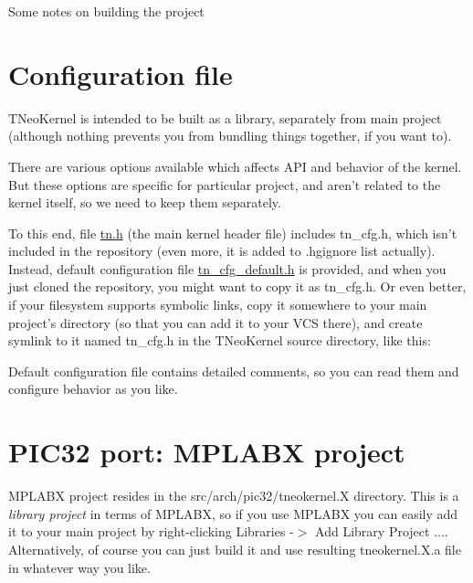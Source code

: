Some notes on building the project\hypertarget{building_configuration_file}{}\section{Configuration file}\label{building_configuration_file}
T\+Neo\+Kernel is intended to be built as a library, separately from main project (although nothing prevents you from bundling things together, if you want to).

There are various options available which affects A\+P\+I and behavior of the kernel. But these options are specific for particular project, and aren't related to the kernel itself, so we need to keep them separately.

To this end, file {\ttfamily \hyperlink{tn_8h}{tn.\+h}} (the main kernel header file) includes {\ttfamily tn\+\_\+cfg.\+h}, which isn't included in the repository (even more, it is added to {\ttfamily .hgignore} list actually). Instead, default configuration file {\ttfamily \hyperlink{tn__cfg__default_8h}{tn\+\_\+cfg\+\_\+default.\+h}} is provided, and when you just cloned the repository, you might want to copy it as {\ttfamily tn\+\_\+cfg.\+h}. Or even better, if your filesystem supports symbolic links, copy it somewhere to your main project's directory (so that you can add it to your V\+C\+S there), and create symlink to it named {\ttfamily tn\+\_\+cfg.\+h} in the T\+Neo\+Kernel source directory, like this\+: 


Default configuration file contains detailed comments, so you can read them and configure behavior as you like.\hypertarget{building_building_pic32}{}\section{P\+I\+C32 port\+: M\+P\+L\+A\+B\+X project}\label{building_building_pic32}
M\+P\+L\+A\+B\+X project resides in the {\ttfamily src/arch/pic32/tneokernel.\+X} directory. This is a {\itshape library project} in terms of M\+P\+L\+A\+B\+X, so if you use M\+P\+L\+A\+B\+X you can easily add it to your main project by right-\/clicking {\ttfamily Libraries -\/$>$ Add Library Project ...}. Alternatively, of course you can just build it and use resulting {\ttfamily tneokernel.\+X.\+a} file in whatever way you like. 